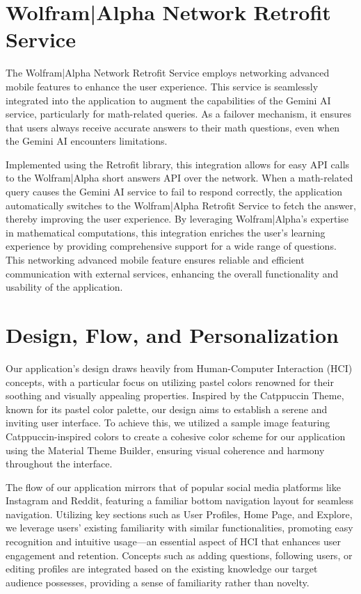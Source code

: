 \section{Wolfram|Alpha Network Retrofit Service}

The Wolfram|Alpha Network Retrofit Service employs networking advanced mobile features to enhance the user experience. This service is seamlessly integrated into the application to augment the capabilities of the Gemini AI service, particularly for math-related queries. As a failover mechanism, it ensures that users always receive accurate answers to their math questions, even when the Gemini AI encounters limitations. 

Implemented using the Retrofit library, this integration allows for easy API calls to the Wolfram|Alpha short answers API over the network. When a math-related query causes the Gemini AI service to fail to respond correctly, the application automatically switches to the Wolfram|Alpha Retrofit Service to fetch the answer, thereby improving the user experience. By leveraging Wolfram|Alpha's expertise in mathematical computations, this integration enriches the user's learning experience by providing comprehensive support for a wide range of questions. This networking advanced mobile feature ensures reliable and efficient communication with external services, enhancing the overall functionality and usability of the application.

\section{Design, Flow, and Personalization}

Our application's design draws heavily from Human-Computer Interaction (HCI) concepts, with a particular focus on utilizing pastel colors renowned for their soothing and visually appealing properties. Inspired by the Catppuccin Theme, known for its pastel color palette, our design aims to establish a serene and inviting user interface. To achieve this, we utilized a sample image featuring Catppuccin-inspired colors to create a cohesive color scheme for our application using the Material Theme Builder, ensuring visual coherence and harmony throughout the interface.

The flow of our application mirrors that of popular social media platforms like Instagram and Reddit, featuring a familiar bottom navigation layout for seamless navigation. Utilizing key sections such as User Profiles, Home Page, and Explore, we leverage users' existing familiarity with similar functionalities, promoting easy recognition and intuitive usage—an essential aspect of HCI that enhances user engagement and retention. Concepts such as adding questions, following users, or editing profiles are integrated based on the existing knowledge our target audience possesses, providing a sense of familiarity rather than novelty.

